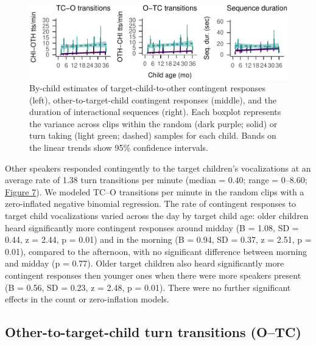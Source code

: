 \documentclass[floatsintext,man]{apa6}
\theoremstyle{definition}
\theoremstyle{definition}
\theoremstyle{definition}
\theoremstyle{remark}
\begin{document}
\begin{figure}
\centering
\includegraphics{Tseltal-CLE_files/figure-latex/fig7-1.pdf}
\caption{\label{fig:fig7}By-child estimates of target-child-to-other
contingent responses (left), other-to-target-child contingent responses
(middle), and the duration of interactional sequences (right). Each
boxplot represents the variance across clips within the random (dark
purple; solid) or turn taking (light green; dashed) samples for each
child. Bands on the linear trends show 95\% confidence intervals.}
\end{figure}

Other speakers responded contingently to the target children's
vocalizations at an average rate of 1.38 turn transitions per minute
(median = 0.40; range = 0--8.60; \protect\hyperlink{fig7}{Figure 7}). We
modeled TC--O transitions per minute in the random clips with a
zero-inflated negative binomial regression. The rate of contingent
responses to target child vocalizations varied across the day by target
child age: older children heard significantly more contingent responses
around midday (B = 1.08, SD = 0.44, z = 2.44, p = 0.01) and in the
morning (B = 0.94, SD = 0.37, z = 2.51, p = 0.01), compared to the
afternoon, with no significant difference between morning and midday (p
= 0.77). Older target children also heard significantly more contingent
responses then younger ones when there were more speakers present (B =
0.56, SD = 0.23, z = 2.48, p = 0.01). There were no further significant
effects in the count or zero-inflation models.

\subsection{Other-to-target-child turn transitions
(O--TC)}\label{other-to-target-child-turn-transitions-otc}
\end{document}
